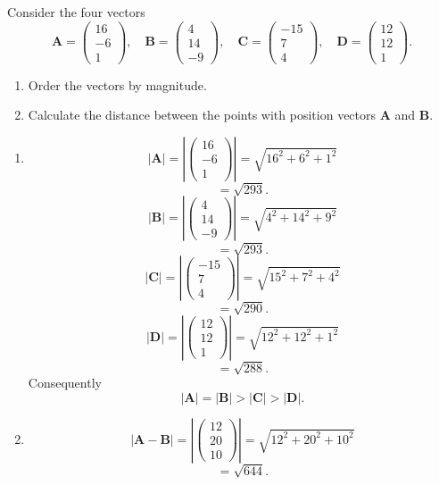Consider the four vectors
\[
\mathbf{A} = \begin{pmatrix} 16\\ -6 \\ 1 \end{pmatrix}, \quad \mathbf{B} = \begin{pmatrix} 4\\14\\-9 \end{pmatrix}, \quad \mathbf{C} = \begin{pmatrix} -15\\ 7\\ 4 \end{pmatrix}, \quad \mathbf{D} = \begin{pmatrix} 12\\12\\1 \end{pmatrix}.
\]
\begin{enumerate}
\item
Order the vectors by magnitude.
\item
Calculate the distance between the points with position vectors $\mathbf{A}$ and $\mathbf{B}$.
\end{enumerate}

\begin{enumerate}
\item
\[
|\mathbf{A}| = \left|\begin{pmatrix}
16\\
-6\\
1
\end{pmatrix}\right| = \sqrt{16^2 + 6^2 + 1^2}
\]
\[
= \sqrt{293}.
\]
\[
|\mathbf{B}| = \left| \begin{pmatrix}
4\\
14\\
-9
\end{pmatrix}\right| = \sqrt{4^2 + 14^2 + 9^2}
\]
\[
=\sqrt{293}.
\]
\[
|\mathbf{C}| = 
\left|\begin{pmatrix}
-15\\
7\\
4
\end{pmatrix}\right| = \sqrt{15^2 + 7^2 + 4^2}
\]
\[
= \sqrt{290}.
\]
\[
|\mathbf{D}| = 
\left|\begin{pmatrix}
12\\
12\\
1
\end{pmatrix}\right| = \sqrt{12^2 + 12^2 + 1^2}
\]
\[
= \sqrt{288}.
\]
Consequently
\[
|\mathbf{A}| = |\mathbf{B}| > |\mathbf{C}| > |\mathbf{D}|.
\]
\item
\[
|\mathbf{A - B}| = \left|\begin{pmatrix}
12\\
20\\
10
\end{pmatrix}\right| = \sqrt{12^2 + 20^2 + 10^2}
\]
\[
= \sqrt{644}.
\]
\end{enumerate}